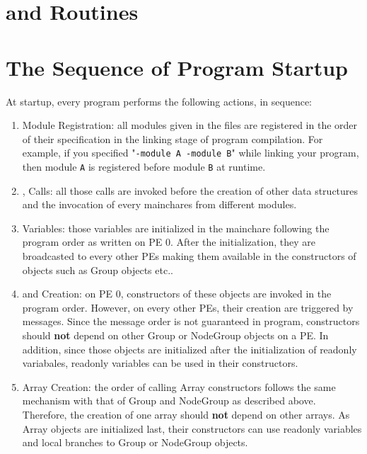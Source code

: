 \section{ and  Routines}


\section{The Sequence of \charmpp{} Program Startup}


At startup, every \charmpp{} program performs the following actions, in sequence:
\begin{enumerate}
\item Module Registration: all modules given in the  files are registered in the order
of their specification in the linking stage of program compilation.
For example, if you specified "{\tt -module A -module B}" while linking your \charmpp{} program,
then module {\tt A} is registered before module {\tt B} at runtime.

\item {}, Calls: all those calls are invoked before the
creation of other \charmpp{} data structures and the invocation of every
mainchares from different modules.

\item {} Variables: those variables are initialized in the mainchare following the program order as written on PE 0. After the initialization, they
are broadcasted to every other PEs making them available in the constructors
of \charmpp{} objects such as Group objects etc..

\item {} and  Creation: on PE 0, constructors of these
objects are invoked in the program order. However, on every other PEs, their
creation are triggered by messages. Since the message order is not guaranteed
in \charmpp{} program, constructors should \textbf{not} depend on other Group
or NodeGroup objects on a PE. In addition, since those objects are initialized
after the initialization of readonly variabales, readonly variables can be used
in their constructors.

\item \charmpp{} Array Creation: the order of calling Array constructors follows
the same mechanism with that of Group and NodeGroup as described above.
Therefore, the creation of one array should \textbf{not} depend on other arrays.
As Array objects are initialized last, their constructors can use 
readonly variables and local branches to Group or NodeGroup objects.
\end{enumerate}
